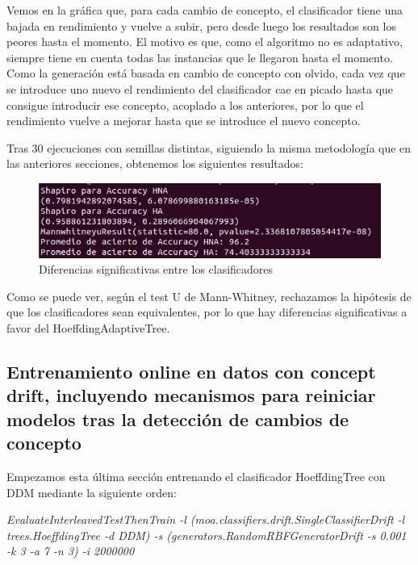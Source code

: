 Vemos en la gráfica que, para cada cambio de concepto, el clasificador tiene una bajada en rendimiento y vuelve a subir, pero desde luego los resultados son los peores hasta el momento. El motivo es que, como el algoritmo no es adaptativo, siempre tiene en cuenta todas las instancias que le llegaron hasta el momento. Como la generación está basada en cambio de concepto con olvido, cada vez que se introduce uno nuevo el rendimiento del clasificador cae en picado hasta que consigue introducir ese concepto, acoplado a los anteriores, por lo que el rendimiento vuelve a mejorar hasta que se introduce el nuevo concepto.

Tras 30 ejecuciones con semillas distintas, siguiendo la misma metodología que en las anteriores secciones, obtenemos los siguientes resultados:

\begin{figure}[H] %
	\centering
	\includegraphics[scale=0.5]{test4.png}  %
	\caption{Diferencias significativas entre los clasificadores} 
	\label{fig:test4}
\end{figure}

Como se puede ver, según el test U de Mann-Whitney, rechazamos la hipótesis de que los clasificadores sean equivalentes, por lo que hay diferencias significativas a favor del HoeffdingAdaptiveTree.

\subsection{Entrenamiento online en datos con concept drift, incluyendo mecanismos para reiniciar modelos tras la detección de cambios de concepto}

Empezamos esta última sección entrenando el clasificador HoeffdingTree con DDM mediante la siguiente orden:

\textit{EvaluateInterleavedTestThenTrain -l (moa.classifiers.drift.SingleClassifierDrift -l trees.HoeffdingTree -d DDM) -s (generators.RandomRBFGeneratorDrift -s 0.001 -k 3 -a 7 -n 3) -i 2000000}

